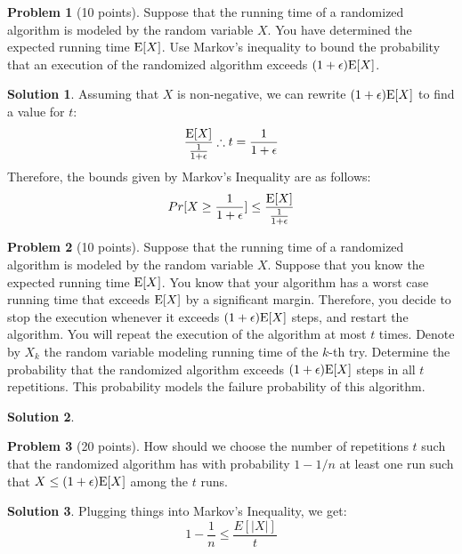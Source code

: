 \documentclass{article}
\theoremstyle{definition}
\newtheorem{problem}{Problem}
\newtheorem*{solution}{Solution}
\newcommand{\E}{\textup{E}}
\begin{document}
\begin{problem}[10 points]
Suppose that the running time of a randomized algorithm is modeled by
the random variable $X$. You have determined the expected running time
$\E[X]$. Use Markov's inequality to bound the probability that an
execution of the randomized algorithm exceeds
$(1+\epsilon)\E[X]$. 
\end{problem}
\begin{solution}
Assuming that $X$ is non-negative, we can rewrite $(1 + \epsilon)\E[X]$ to find a value for $t$:
$$ \frac{\E[X]}{\frac{1}{1+\epsilon}} \therefore t = \frac{1}{1+\epsilon} $$
Therefore, the bounds given by Markov's Inequality are as follows:
$$ Pr[X \geq \frac{1}{1+\epsilon}] \leq \frac{\E[X]}{\frac{1}{1+\epsilon}} $$
\end{solution}

\begin{problem}[10 points]
Suppose that the running time of a randomized algorithm is modeled by
the random variable $X$. Suppose that you know the expected running time
$\E[X]$. You know that your algorithm has a worst case running time
that exceeds $\E[X]$ by a significant margin. Therefore, you decide
to stop the execution whenever it exceeds $(1+\epsilon)\E[X]$ steps,
and restart the algorithm. You will repeat the execution of the
algorithm at most $t$ times. Denote by $X_k$ the random variable
modeling running time of the $k$-th try. Determine the probability
that the randomized algorithm exceeds  $(1+\epsilon)\E[X]$ steps in
all $t$ repetitions. This probability models the failure probability
of this algorithm. 
\end{problem}
\begin{solution}
\end{solution}

\begin{problem} [20 points] How should we choose the number of repetitions $t$
  such that the randomized algorithm has with probability $1-1/n$ at
  least one run such that $X\le (1+\epsilon)\E[X]$ among the $t$ runs.
\end{problem}
\begin{solution}
Plugging things into Markov's Inequality, we get:
$$ 1 - \frac{1}{n} \leq \frac{E[|X|]}{t} $$
\end{solution}
\end{document}
